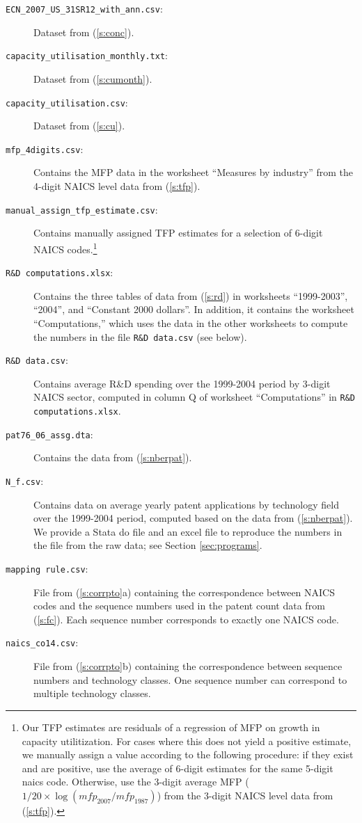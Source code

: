 \documentclass[a4paper,11pt]{article}
\begin{document}
\begin{description}
  \item[\texttt{ECN_2007_US_31SR12_with_ann.csv}:] Dataset from (\ref{s:conc}).
  \item[\texttt{capacity_utilisation_monthly.txt}:] Dataset from (\ref{s:cumonth}).
  \item[\texttt{capacity_utilisation.csv}:] Dataset from (\ref{s:cu}).
  \item[\texttt{mfp_4digits.csv}:] Contains the MFP data in the worksheet ``Measures by industry'' from the 4-digit NAICS level data from (\ref{s:tfp}).
  \item[\texttt{manual_assign_tfp_estimate.csv}:] Contains manually assigned TFP estimates for a selection of 6-digit NAICS codes.\footnote{Our TFP estimates are residuals of a regression of MFP on growth in capacity utilitization. For cases where this does not yield a positive estimate, we manually assign a value according to the following procedure: if they exist and are positive, use the average of 6-digit estimates for the same 5-digit naics code. Otherwise, use the 3-digit average MFP ($1/20 \times \log(\textit{mfp}_{2007}/\textit{mfp}_{1987})$) from the 3-digit NAICS level data from (\ref{s:tfp}).}
  \item[\texttt{R\&D computations.xlsx}:] Contains the three tables of data from (\ref{s:rd}) in worksheets ``1999-2003'', ``2004'', and ``Constant 2000 dollars''. In addition, it contains the worksheet ``Computations,'' which uses the data in the other worksheets to compute the numbers in the file \texttt{R\&D data.csv} (see below).
  \item[\texttt{R\&D data.csv}:] Contains average R\&D spending over the 1999-2004 period by 3-digit NAICS sector, computed in column Q of worksheet ``Computations'' in \texttt{R\&D computations.xlsx}.
  \item[\texttt{pat76_06_assg.dta}:] Contains the data from (\ref{s:nberpat}).
  \item[\texttt{N_f.csv}:] Contains data on average yearly patent applications by technology field over the 1999-2004 period, computed based on the data from (\ref{s:nberpat}). We provide a Stata do file and an excel file to reproduce the numbers in the file from the raw data; see Section \ref{sec:programs}.
  \item[\texttt{mapping rule.csv}:] File from (\ref{s:corrpto}a) containing the correspondence between NAICS codes and the sequence numbers used in the patent count data from (\ref{s:fc}). Each sequence number corresponds to exactly one NAICS code.
  \item[\texttt{naics_co14.csv}:] File from (\ref{s:corrpto}b) containing the correspondence between sequence numbers and technology classes. One sequence number can correspond to multiple technology classes.

\end{description}
\end{document}
